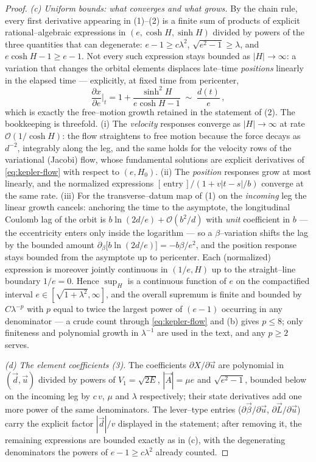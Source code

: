 \documentclass[11pt]{article}
\newcommand{\order}[1]{\mathcal O\!\left(#1\right)}
\begin{document}
\begin{proof}
\emph{(c) Uniform bounds: what converges and what grows.} By the chain rule, every first
derivative appearing in (1)--(2) is a finite sum of products of explicit rational--algebraic
expressions in $(e,\cosh H,\sinh H)$ divided by powers of the three quantities that can
degenerate: $e-1\ge c\lambda^2$, $\sqrt{e^2-1}\ge\lambda$, and $e\cosh H-1\ge e-1$. Not every such
expression stays bounded as $|H|\to\infty$: a variation that changes the orbital elements
displaces late--time \emph{positions} linearly in the elapsed time --- explicitly, at fixed time
from pericenter,
\begin{equation*}
  \frac{\partial x}{\partial e}\Big|_{t}=1+\frac{\sinh^2H}{e\cosh H-1}\;\sim\;\frac{d(t)}e\,,
\end{equation*}
which is exactly the free--motion growth retained in the statement of (2). The bookkeeping is
threefold. (i) The \emph{velocity} responses converge as $|H|\to\infty$ at rate
$\order{1/\cosh H}$: the flow straightens to free motion because the force decays as $d^{-2}$,
integrably along the leg, and the same holds for the velocity rows of the variational (Jacobi)
flow, whose fundamental solutions are explicit derivatives of \eqref{eq:kepler-flow} with respect
to $(e,H_0)$. (ii) The \emph{position} responses grow at most linearly, and the normalized
expressions $[\,\text{entry}\,]/(1+v|t-s|/b)$ converge at the same rate. (iii) For the
transverse--datum map of (1) on the \emph{incoming} leg the linear growth cancels: anchoring the
time to the asymptote, the longitudinal Coulomb lag of the orbit is $b\ln(2d/e)+\order{b^2/d}$
with \emph{unit} coefficient in $b$ --- the eccentricity enters only inside the logarithm --- so
a $\beta$--variation shifts the lag by the bounded amount
$\partial_\beta\big[b\ln(2d/e)\big]=-b\beta/e^2$, and the position response stays bounded from
the asymptote up to pericenter. Each (normalized) expression is moreover jointly continuous in
$(1/e,H)$ up to the straight--line boundary $1/e=0$. Hence
$\sup_H$ is a continuous function of $e$ on the compactified interval
$e\in[\sqrt{1+\lambda^2},\infty]$, and the overall supremum is finite and bounded by
$C\lambda^{-p}$ with $p$ equal to twice the largest power of $(e-1)$ occurring in any denominator
--- a crude count through \eqref{eq:kepler-flow} and (b) gives $p\le8$; only finiteness and
polynomial growth in $\lambda^{-1}$ are used in the text, and any $p\ge2$ serves.

\emph{(d) The element coefficients (3).} The coefficients $\partial X/\partial\vec u$ are
polynomial in $(\vec d,\vec u)$ divided by powers of $V_1=\sqrt{2E}$,
$|\vec A|=\mu e$ and $\sqrt{e^2-1}$, bounded below on the incoming leg by $c\,v$, $\mu$ and
$\lambda$ respectively; their state derivatives add one more power of the same denominators. The
lever--type entries ($\partial\vec\beta/\partial\vec u$, $\partial\vec L/\partial\vec u$) carry the
explicit factor $|\vec d|/v$ displayed in the statement; after removing it, the remaining
expressions are bounded exactly as in (c), with the degenerating denominators the powers of
$e-1\ge c\lambda^2$ already counted.
\end{proof}
\end{document}
